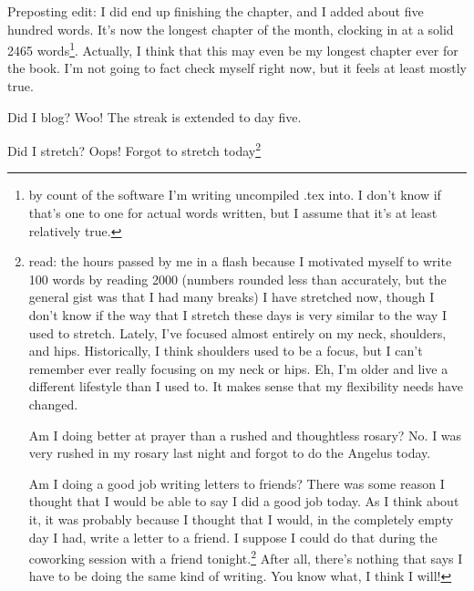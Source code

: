 \documentclass[12pt]{article}[titlepage]
\newcommand{\1}{\={a}}
\newcommand{\2}{\={e}}
\newcommand{\3}{\={\i}}
\newcommand{\4}{\=o}
\newcommand{\5}{\=u}
\newcommand{\6}{\={A}}
\renewcommand{\,}{\textsuperscript{,}}
\begin{document}
\begin{itemize}
Preposting edit: I did end up finishing the chapter, and I added about five hundred words.
It's now the longest chapter of the month, clocking in at a solid 2465 words\footnote{by count of the software I'm writing uncompiled .tex into. I don't know if that's one to one for actual words written, but I assume that it's at least relatively true.}.
Actually, I think that this may even be my longest chapter ever for the book.
I'm not going to fact check myself right now, but it feels at least mostly true.
\item Did I blog? Woo! The streak is extended to day five.
\item Did I stretch? Oops! Forgot to stretch today\footnote{read: the hours passed by me in a flash because I motivated myself to write 100 words by reading 2000 (numbers rounded less than accurately, but the general gist was that I had many breaks)
I have stretched now, though I don't know if the way that I stretch these days is very similar to the way I used to stretch.
Lately, I've focused almost entirely on my neck, shoulders, and hips.
Historically, I think shoulders used to be a focus, but I can't remember ever really focusing on my neck or hips.
Eh, I'm older and live a different lifestyle than I used to.
It makes sense that my flexibility needs have changed.
\item Am I doing better at prayer than a rushed and thoughtless rosary? No. I was very rushed in my rosary last night and forgot to do the Angelus today.
\item Am I doing a good job writing letters to friends? There was some reason I thought that I would be able to say I did a good job today.
As I think about it, it was probably because I thought that I would, in the completely empty day I had, write a letter to a friend.
I suppose I could do that during the coworking session with a friend tonight.\footnote{in retrospect, writing all day before doing a fun writing hang may not have been my best choice. I count a net words of almost 5700, which is already a personal best.
Another hour of writing means that I'll have to find something else to occupy my writing anyways, since I've already done as much writing for NaNoWriMo as I'm letting myself (I forget if I mentioned why, but my goal is to write one fifty-ish thousand word novel this month. If I let myself write too much in a given day, that means that won't happen, probably)}
After all, there's nothing that says I have to be doing the same kind of writing.
You know what, I think I will!

}
\end{itemize}
\end{document}
